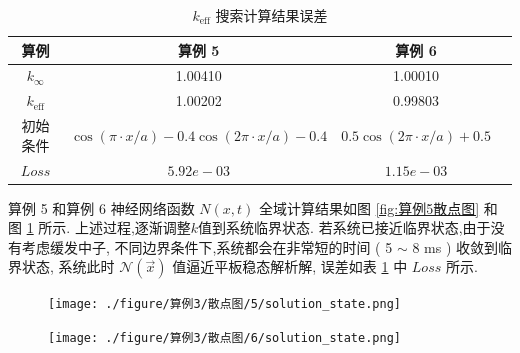 \documentclass{Sichuan Normal University}
\begin{document}
\begin{table}[H]
    \caption{$k_{\text{eff}}$ 搜索计算结果误差}
    \centering
    \begin{tabular}{cccc}
        \toprule
        \textbf{算例} & \textbf{算例 5} & \textbf{算例 6} \\
        \midrule
        $k_{\infty}$ & 1.00410 & 1.00010 \\
        $k_{\mathrm{eff}}$ & 1.00202 & 0.99803 \\
        初始条件 & $\cos (\pi \cdot x / a)-0.4 \cos (2 \pi \cdot x / a)-0.4$ & $0.5 \cos (2 \pi \cdot x / a)+0.5$ \\
        $Loss$ & $5.92e-03$ & $1.15e-03$ \\
      \bottomrule
    \end{tabular}
    \label{tab:k_eff_error}
\end{table}

算例 5 和算例 6 神经网络函数 $N(x, t)$ 全域计算结果如图 \ref{fig:算例5散点图} 和 图 \ref{fig:算例6散点图} 所示.
上述过程,逐渐调整$k$值到系统临界状态. 若系统已接近临界状态,由于没有考虑缓发中子, 不同边界条件下,系统都会在非常短的时间
( 5 $\sim$ 8 ms ) 收敛到临界状态, 系统此时 $\mathcal{N}(\vec{x})$ 值逼近平板稳态解析解, 误差如表 \ref{tab:k_eff_error} 中 $Loss$ 所示.

\begin{figure}[H]
    \centering
    \begin{minipage}[c]{0.48\textwidth}
    \centering
    \texttt{[image: ./figure/算例3/散点图/5/solution\_state.png]}
    \end{minipage}
    \hspace{0.02\textwidth}
    \begin{minipage}[c]{0.48\textwidth}
    \centering
    \texttt{[image: ./figure/算例3/散点图/6/solution\_state.png]}
    \end{minipage}\\[3mm]
    \begin{minipage}[t]{0.48\textwidth}
    \centering
    \label{fig:算例5散点图}
    \end{minipage}
    \hspace{0.02\textwidth}
    \begin{minipage}[t]{0.48\textwidth}
    \centering
    \label{fig:算例6散点图}
    \end{minipage}
    \end{figure}
\end{document}
